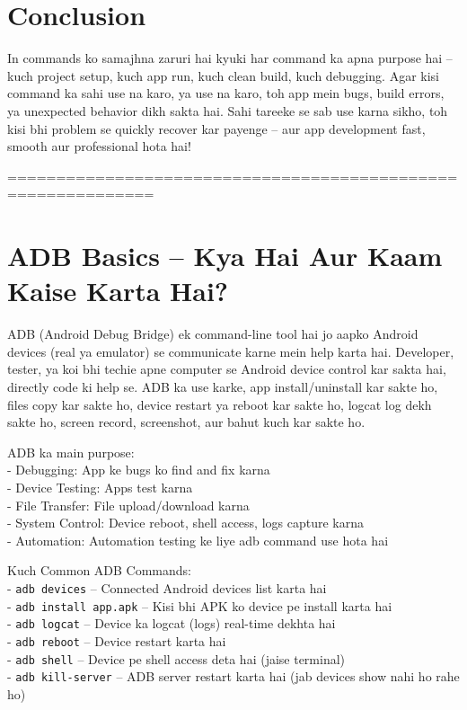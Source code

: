\documentclass[a4paper]{article}
\newcommand\imp[1]{{\color{ImportantRed}#1}}
\begin{document}
\vspace{1em}
\section*{Conclusion}
In commands ko samajhna zaruri hai kyuki har command ka apna purpose hai – kuch project setup, kuch app run, kuch clean build, kuch debugging. Agar kisi command ka sahi use na karo, ya use na karo, toh app mein bugs, build errors, ya unexpected behavior dikh sakta hai.  
Sahi tareeke se sab use karna sikho, toh kisi bhi problem se quickly recover kar payenge – aur app development fast, smooth aur professional hota hai!

=============================================================
\section*{ADB Basics – Kya Hai Aur Kaam Kaise Karta Hai?}
\imp{ADB (Android Debug Bridge)} ek command-line tool hai jo aapko Android devices (real ya emulator) se communicate karne mein help karta hai. Developer, tester, ya koi bhi techie apne computer se Android device control kar sakta hai, directly code ki help se. ADB ka use karke, app install/uninstall kar sakte ho, files copy kar sakte ho, device restart ya reboot kar sakte ho, logcat log dekh sakte ho, screen record, screenshot, aur bahut kuch kar sakte ho.

\imp{ADB ka main purpose:}\\
- \imp{Debugging:} App ke bugs ko find and fix karna\\
- \imp{Device Testing:} Apps test karna\\
- \imp{File Transfer:} File upload/download karna\\
- \imp{System Control:} Device reboot, shell access, logs capture karna\\
- \imp{Automation:} Automation testing ke liye adb command use hota hai

\imp{Kuch Common ADB Commands:}\\
- \texttt{adb devices} – Connected Android devices list karta hai\\
- \texttt{adb install app.apk} – Kisi bhi APK ko device pe install karta hai\\
- \texttt{adb logcat} – Device ka logcat (logs) real-time dekhta hai\\
- \texttt{adb reboot} – Device restart karta hai\\
- \texttt{adb shell} – Device pe shell access deta hai (jaise terminal)\\
- \texttt{adb kill-server} – ADB server restart karta hai (jab devices show nahi ho rahe ho)
\end{document}

